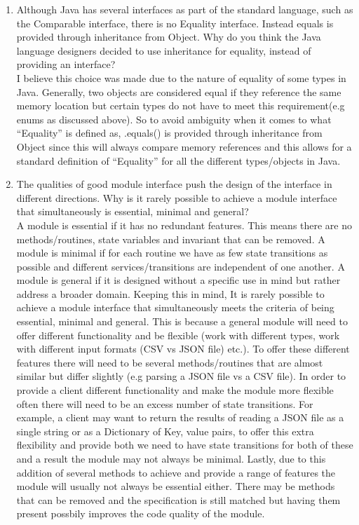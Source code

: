 \documentclass[12pt]{article}
\begin{document}
\begin{enumerate}
  
\item Although Java has several interfaces as part of the standard language,
  such as the Comparable interface, there is no Equality interface.  Instead
  equals is provided through inheritance from Object.  Why do you think the
  Java language designers decided to use inheritance for equality, instead of
  providing an interface?\\
  
  I believe this choice was made due to the nature of equality of some types in Java. Generally, two objects are considered equal if they reference the same memory location but certain types do not have to meet this requirement(e.g enums as discussed above). So to avoid ambiguity when it comes to what ``Equality'' is defined as, .equals() is provided through inheritance from Object since this will always compare memory references and this allows for a standard definition of ``Equality'' for all the different types/objects in Java.
  
\item The qualities of good module interface push the design of the interface in
  different directions. Why is it rarely possible to achieve a module interface
  that simultaneously is essential, minimal and general?\\
  
  A module is essential if it has no redundant features. This means there are no methods/routines, state variables and invariant that can be removed. A module is minimal if for each routine we have as few state transitions as possible and different services/transitions are independent of one another. A module is general if it is designed without a specific use in mind but rather address a broader domain. Keeping this in mind, It is rarely possible to achieve a module interface that simultaneously meets the criteria of being essential, minimal and general. This is because a general module will need to offer different functionality and be flexible (work with different types, work with different input formats (CSV vs JSON file) etc.). To offer these different features there will need to be several methods/routines that are almost similar but differ slightly (e.g parsing a JSON file vs a CSV file). In order to provide a client different functionality and make the module more flexible often there will need to be an excess number of state transitions. For example, a client may want to return the results of reading a JSON file as a single string or as a Dictionary of Key, value pairs, to offer this extra flexibility and provide both we need to have state transitions for both of these and a result the module may not always be minimal. Lastly, due to this addition of several methods to achieve and provide a range of features the module will usually not always be essential either. There may be methods that can be removed and the specification is still matched but having them present possbily improves the code quality of the module. 
  
  
\end{enumerate}
\end{document}
